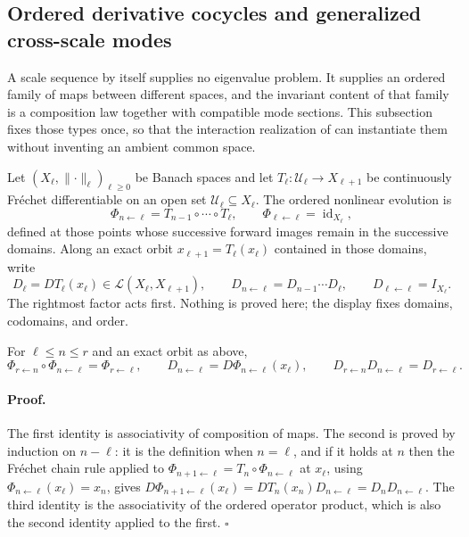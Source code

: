 \subsection{Ordered derivative cocycles and generalized cross-scale modes}
\label{sec:rg-generalized-modes}

A scale sequence by itself supplies no eigenvalue problem. It supplies an
ordered family of maps between different spaces, and the invariant content of
that family is a composition law together with compatible mode sections. This
subsection fixes those types once, so that the interaction realization of
 can instantiate them without inventing an ambient
common space.

Let \((X_\ell,\lVert\cdot\rVert_\ell)_{\ell\geq0}\) be Banach spaces and let
\(T_\ell:\mathcal U_\ell\to X_{\ell+1}\) be continuously Fr\'echet differentiable on an
open set \(\mathcal U_\ell\subseteq X_\ell\). The ordered nonlinear evolution is
\begin{equation}
\Phi_{n\leftarrow\ell}=T_{n-1}\circ\cdots\circ T_\ell,
\qquad
\Phi_{\ell\leftarrow\ell}=\operatorname{id}_{X_\ell},
\label{eq:rg-ordered-evolution}
\end{equation}
defined at those points whose successive forward images remain in the
successive domains. Along an exact orbit \(x_{\ell+1}=T_\ell(x_\ell)\) contained
in those domains, write
\begin{equation}
D_\ell=DT_\ell(x_\ell)\in\mathcal L(X_\ell,X_{\ell+1}),
\qquad
D_{n\leftarrow\ell}=D_{n-1}\cdots D_\ell,
\qquad
D_{\ell\leftarrow\ell}=I_{X_\ell}.
\label{eq:rg-derivative-cocycle}
\end{equation}
The rightmost factor acts first. Nothing is proved here; the display fixes
domains, codomains, and order. 

For \(\ell\leq n\leq r\) and an exact orbit as above,
\begin{equation}
\Phi_{r\leftarrow n}\circ\Phi_{n\leftarrow\ell}=\Phi_{r\leftarrow\ell},
\qquad
D_{n\leftarrow\ell}=D\Phi_{n\leftarrow\ell}(x_\ell),
\qquad
D_{r\leftarrow n}D_{n\leftarrow\ell}=D_{r\leftarrow\ell}.
\label{eq:rg-cocycle-composition}
\end{equation}

\paragraph{Proof.}
The first identity is associativity of composition of maps. The second is
proved by induction on \(n-\ell\): it is the definition when \(n=\ell\), and if
it holds at \(n\) then the Fr\'echet chain rule applied to
\(\Phi_{n+1\leftarrow\ell}=T_n\circ\Phi_{n\leftarrow\ell}\) at \(x_\ell\), using
\(\Phi_{n\leftarrow\ell}(x_\ell)=x_n\), gives
\(D\Phi_{n+1\leftarrow\ell}(x_\ell)=DT_n(x_n)D_{n\leftarrow\ell}
=D_nD_{n\leftarrow\ell}\). The third identity is the associativity of the
ordered operator product, which is also the second identity applied to the
first. \(\square\)

